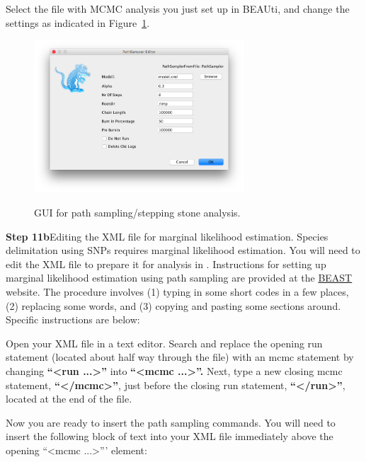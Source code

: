{    	    

Select the file with MCMC analysis you just set up in BEAUti, and change the settings as indicated in Figure~\ref{fig:pathsampler}.

    \begin{figure}[htbp]
        \centering
        {\includegraphics[width=0.7\textwidth]{../screenshots/pathsampler}}
        \caption{GUI for path sampling/stepping stone analysis.}
        \label{fig:pathsampler}
    \end{figure}



{\bf Step 11b}{Editing the XML file for marginal likelihood estimation.}
Species delimitation using SNPs requires marginal likelihood estimation. 
You will need to edit the XML file to prepare it for analysis in . Instructions for setting up
marginal likelihood estimation using path sampling are provided at the \href{http://www.beast2.org/tutorials}{BEAST} website. The procedure involves (1) typing in some short codes in a few places, (2) replacing some words, and (3) copying and pasting some sections around. Specific instructions are below:
 
Open your XML file in a text editor. Search and replace the opening run statement (located about half way through the file) with an mcmc statement by changing {\bf ``<run ...>''} into {\bf ``<mcmc ...>''.} Next, type a new closing mcmc statement, {\bf ``</mcmc>''}, just before the closing run statement, {\bf ``</run>''}, located at the end of the file.

Now you are ready to insert the path sampling commands. You will need to insert the following block of text into your XML file immediately above the opening ``<mcmc ...>''' element:

}
